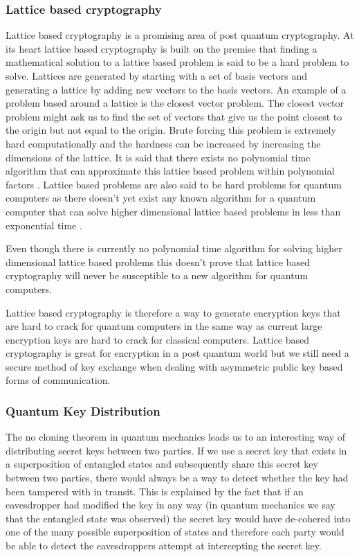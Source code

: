 \documentclass{article}
\begin{document}
\subsubsection{Lattice based cryptography}
Lattice based cryptography is a promising area of post quantum cryptography. At its heart lattice based cryptography is built on the premise that finding a mathematical solution to a lattice based problem is said to be a hard problem to solve. Lattices are generated by starting with a set of basis vectors and generating a lattice by adding new vectors to the basis vectors. An example of a problem based around a lattice is the closest vector problem. The closest vector problem might ask us to find the set of vectors that give us the point closest to the origin but not equal to the origin. Brute forcing this problem is extremely hard computationally and the hardness can be increased by increasing the dimensions of the lattice. It is said that there exists no polynomial time algorithm that can approximate this lattice based problem within polynomial factors \cite{Micciancio2008Lattice-based}. Lattice based problems are also said to be hard problems for quantum computers as there doesn't yet exist any known algorithm for a quantum computer that can solve higher dimensional lattice based problems in less than exponential time \cite{Micciancio2008Lattice-based}.

Even though there is currently no polynomial time algorithm for solving higher dimensional lattice based problems this doesn't prove that lattice based cryptography will never be susceptible to a new algorithm for quantum computers.

\vspace{5mm}

Lattice based cryptography is therefore a way to generate encryption keys that are hard to crack for quantum computers in the same way as current large encryption keys are hard to crack for classical computers.  Lattice based cryptography is great for encryption in a post quantum world but we still need a secure method of key exchange when dealing with asymmetric public key based forms of communication.  

\subsubsection{Quantum Key Distribution}
The no cloning theorem in quantum mechanics leads us to an interesting way of distributing secret keys between two parties. If we use a secret key that exists in a superposition of entangled states and subsequently share this secret key between two parties, there would always be a way to detect whether the key had been tampered with in transit. This is explained by the fact that if an eavesdropper had modified the key in any way (in quantum mechanics we say that the entangled state was observed) the secret key would have de-cohered into one of the many possible superposition of states and therefore each party would be able to detect the eavesdroppers attempt at intercepting the secret key. 
\end{document}
